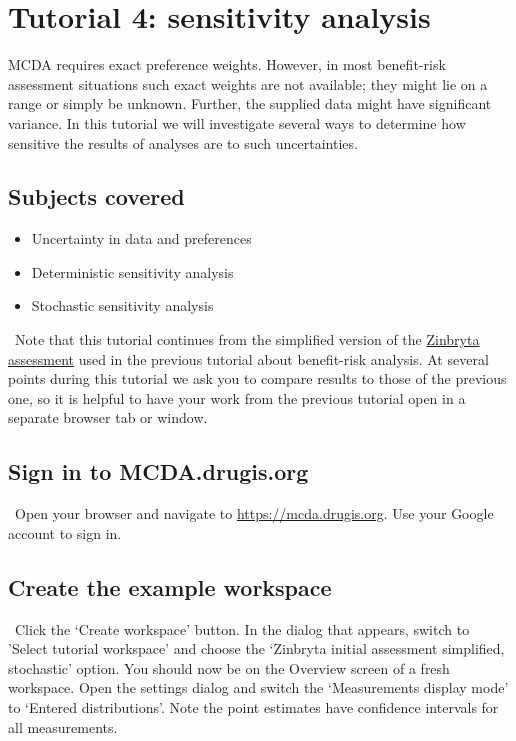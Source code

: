 \documentclass[00_mcda_tutorial.tex]{subfiles}
\begin{document}
\section*{Tutorial 4: sensitivity analysis}
\addtocounter{section}{1}

MCDA requires exact preference weights. However, in most benefit-risk assessment situations such exact weights are not available; they might lie on a range or simply be unknown. Further, the supplied data might have significant variance. In this tutorial we will investigate several ways to determine how sensitive the results of analyses are to such uncertainties.

\subsection*{Subjects covered}
\begin{itemize}
\item Uncertainty in data and preferences
\item Deterministic sensitivity analysis
\item Stochastic sensitivity analysis
\end{itemize}

\noindent \faExclamationTriangle \, Note that this tutorial continues from the simplified version of the \href{https://www.ema.europa.eu/en/medicines/human/EPAR/zinbryta#authorisation-details-section}{Zinbryta assessment} used in the previous tutorial about benefit-risk analysis. At several points during this tutorial we ask you to compare results to those of the previous one, so it is helpful to have your work from the previous tutorial open in a separate browser tab or window.

\subsection*{Sign in to MCDA.drugis.org}
\leftpointright \, Open your browser and navigate to \href{https://mcda.drugis.org}{https://mcda.drugis.org}. Use your Google account to sign in.

\subsection*{Create the example workspace}
\leftpointright \, Click the ‘Create workspace’ button. In the dialog that appears, switch to 'Select tutorial workspace' and choose the ‘Zinbryta initial assessment simplified, stochastic’ option. You should now be on the Overview screen of a fresh workspace. Open the settings dialog and switch the ‘Measurements display mode’ to ‘Entered distributions’. Note the point estimates have confidence intervals for all measurements.
\newline
\end{document}
